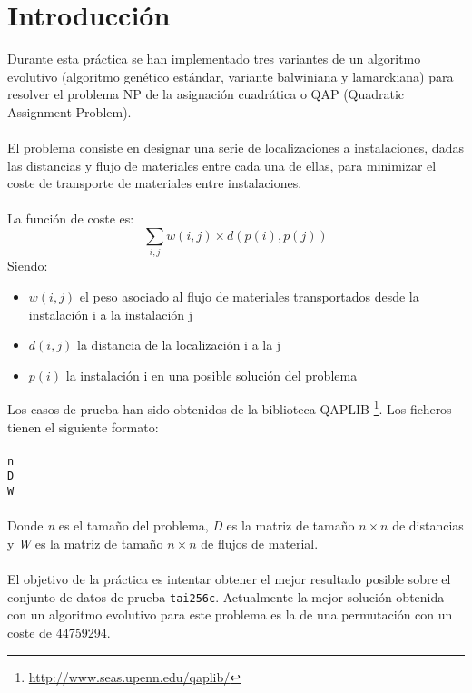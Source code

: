 \newpage %

\tableofcontents %


\newpage


\section{Introducción}

Durante esta práctica se han implementado tres variantes de un algoritmo evolutivo (algoritmo genético estándar, variante balwiniana y lamarckiana) para resolver el problema NP de la asignación cuadrática o QAP (Quadratic Assignment Problem).
\\ \\
El problema consiste en designar una serie de localizaciones a instalaciones, dadas las distancias y flujo de materiales entre cada una de ellas, para minimizar el coste de transporte de materiales entre instalaciones.
\\ \\
La función de coste es:
\[ \sum_{i,j} w(i,j) \times d(p(i),p(j)) \]
Siendo:
\begin{itemize}
	\item $ w(i,j) $ el peso asociado al flujo de materiales transportados desde la instalación i a la instalación j
	\item $ d(i,j) $ la distancia de la localización i a la j
	\item $ p(i) $ la instalación i en una posible solución del problema
\end{itemize}
Los casos de prueba han sido obtenidos de la biblioteca QAPLIB \footnote{\url{http://www.seas.upenn.edu/qaplib/}}. Los ficheros tienen el siguiente formato:
\\ \\
\texttt{n}
\\
\texttt{D}
\\
\texttt{W}
\\ \\
Donde \textit{n} es el tamaño del problema, \textit{D} es la matriz de tamaño $ n \times n $ de distancias y \textit{W} es la matriz de tamaño $ n \times n $ de flujos de material.
\\ \\
El objetivo de la práctica es intentar obtener el mejor resultado posible sobre el conjunto de datos de prueba \texttt{tai256c}. Actualmente la mejor solución obtenida con un algoritmo evolutivo para este problema es la de una permutación con un coste de 44759294.

